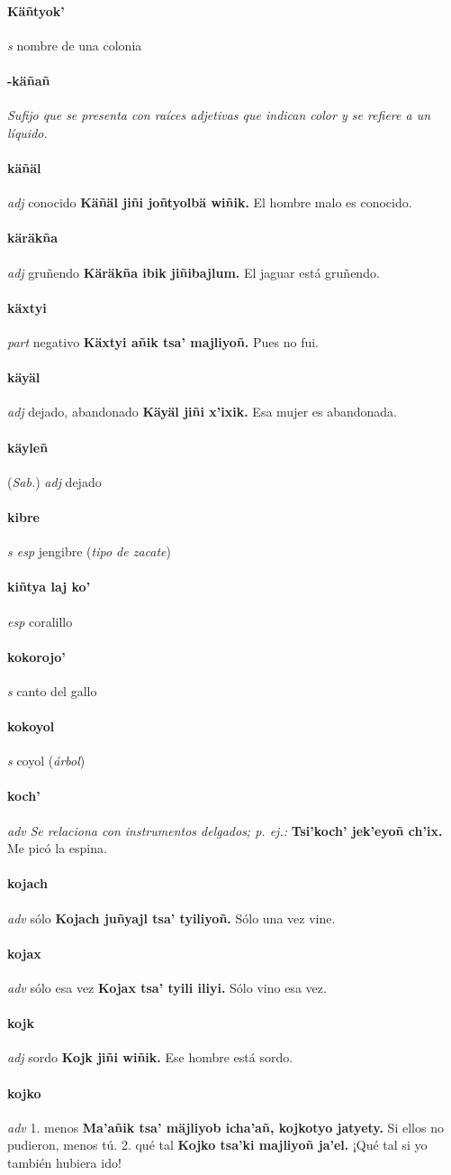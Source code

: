 \documentclass{scrbook}
\newcommand{\entry}[1]{\paragraph{#1}}
\newcommand{\onedefinition}[1]{#1.}
\newcommand{\nontranslationdef}[1]{\textit{#1}}
\newcommand{\partofspeech}[1]{\textit{#1}}
\newcommand{\spanishtranslation}[1]{#1}
\newcommand{\clarification}[1]{(\textit{#1})}
\newcommand{\cholexample}[1]{\textbf{#1}}
\newcommand{\exampletranslation}[1]{#1}
\newcommand{\relevantdialect}[1]{(\textit{#1})}
\begin{document}
\begin{multicols}{2}
\entry{Käñtyok'}
\partofspeech{s}
\spanishtranslation{nombre de una colonia}

\entry{-käñañ}
\nontranslationdef{Sufijo que se presenta con raíces adjetivas que indican color y se refiere a un líquido.}

\entry{käñäl}
\partofspeech{adj}
\spanishtranslation{conocido}
\cholexample{Käñäl jiñi joñtyolbä wiñik.}
\exampletranslation{El hombre malo es conocido.}

\entry{käräkña}
\partofspeech{adj}
\spanishtranslation{gruñendo}
\cholexample{Käräkña ibik jiñibajlum.}
\exampletranslation{El jaguar está gruñendo.}

\entry{käxtyi}
\partofspeech{part}
\spanishtranslation{negativo}
\cholexample{Käxtyi añik tsa' majliyoñ.}
\exampletranslation{Pues no fui.}

\entry{käyäl}
\partofspeech{adj}
\spanishtranslation{dejado, abandonado}
\cholexample{Käyäl jiñi x'ixik.}
\exampletranslation{Esa mujer es abandonada.}

\entry{käyleñ}
\relevantdialect{Sab.}
\partofspeech{adj}
\spanishtranslation{dejado}

\entry{kibre}
\partofspeech{s esp}
\spanishtranslation{jengibre}
\clarification{tipo de zacate}

\entry{kiñtya laj ko'}
\partofspeech{esp}
\spanishtranslation{coralillo}

\entry{kokorojo'}
\partofspeech{s}
\spanishtranslation{canto del gallo}

\entry{kokoyol}
\partofspeech{s}
\spanishtranslation{coyol}
\clarification{árbol}

\entry{koch'}
\partofspeech{adv}
\nontranslationdef{Se relaciona con instrumentos delgados; p. ej.:}
\cholexample{Tsi'koch' jek'eyoñ ch'ix.}
\exampletranslation{Me picó la espina.}

\entry{kojach}
\partofspeech{adv}
\spanishtranslation{sólo}
\cholexample{Kojach juñyajl tsa' tyiliyoñ.}
\exampletranslation{Sólo una vez vine.}

\entry{kojax}
\partofspeech{adv}
\spanishtranslation{sólo esa vez}
\cholexample{Kojax tsa' tyili iliyi.}
\exampletranslation{Sólo vino esa vez.}

\entry{kojk}
\partofspeech{adj}
\spanishtranslation{sordo}
\cholexample{Kojk jiñi wiñik.}
\exampletranslation{Ese hombre está sordo.}

\entry{kojko}
\partofspeech{adv}
\onedefinition{1}
\spanishtranslation{menos}
\cholexample{Ma'añik tsa' mäjliyob icha'añ, kojkotyo jatyety.}
\exampletranslation{Si ellos no pudieron, menos tú.}
\onedefinition{2}
\spanishtranslation{qué tal}
\cholexample{Kojko tsa'ki majliyoñ ja'el.}
\exampletranslation{¡Qué tal si yo también hubiera ido!}


\end{multicols}
\end{document}
